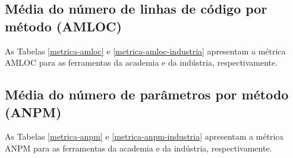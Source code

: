 
\subsection{Média do número de linhas de código por método (AMLOC)}

As Tabelas \ref{metrica-amloc} e \ref{metrica-amloc-industria} apresentam a
métrica AMLOC para as ferramentas da academia e da indústria, respectivamente.



\subsection{Média do número de parâmetros por método (ANPM)}

As Tabelas \ref{metrica-anpm} e \ref{metrica-anpm-industria} apresentam a
métrica ANPM para as ferramentas da academia e da indústria, respectivamente.


